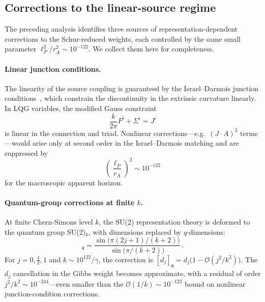 \documentclass[aps,prd,twocolumn,10pt,superscriptaddress,nofootinbib]{revtex4-2}
\begin{document}
\subsection{Corrections to the linear-source regime}
\label{sec:linearity}

The preceding analysis identifies three sources of
representation-dependent corrections to the Schur-reduced weights,
each controlled by the same small parameter
$\ell_P^2/r_A^2 \sim 10^{-122}$.  We collect them here for
completeness.

\paragraph{Linear junction conditions.}

The linearity of the source coupling is guaranteed by the
Israel--Darmois junction conditions~\cite{Israel1966}, which
constrain the discontinuity in the extrinsic curvature linearly.
In LQG variables, the modified Gauss constraint
\begin{equation}
\frac{k}{2\pi}F^i + \Sigma^i = J^i
\label{eq:gauss_modified}
\end{equation}
is linear in the connection and triad.  Nonlinear
corrections---e.g.\ $(J \cdot A)^2$ terms---would arise only at
second order in the Israel--Darmois matching and are suppressed by
\begin{equation}
\left(\frac{\ell_P}{r_A}\right)^2
  \sim 10^{-122}
\label{eq:suppression}
\end{equation}
for the macroscopic apparent horizon.

\paragraph{Quantum-group corrections at finite $k$.}

At finite Chern-Simons level $k$, the SU(2) representation theory
is deformed to the quantum group SU(2)$_k$, with dimensions
replaced by $q$-dimensions:
\begin{equation}
[2j+1]_{\mathfrak{q}}
  = \frac{\sin\!\bigl(\pi(2j+1)/(k+2)\bigr)}
         {\sin\!\bigl(\pi/(k+2)\bigr)}\,.
\label{eq:q_dim}
\end{equation}
For $j = 0, \tfrac{1}{2}, 1$ and $k \sim 10^{122}/\gamma$, the
correction is $[d_j]_{\mathfrak{q}} = d_j\bigl(1 - \mathcal{O}(j^2/k^2)\bigr)$.
The $d_j$ cancellation in the Gibbs weight becomes approximate,
with a residual of order $j^2/k^2 \sim 10^{-244}$---even smaller
than the $\mathcal{O}(1/k) \sim 10^{-122}$ bound on nonlinear
junction-condition corrections.
\end{document}
